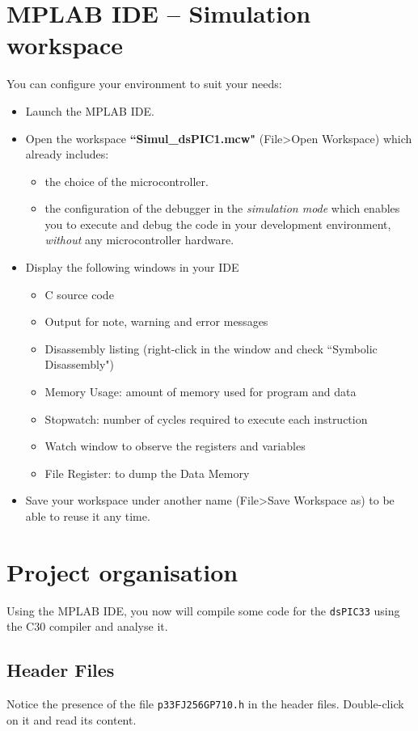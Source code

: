 \documentclass[10pt,a4paper]{article}
\theoremstyle{definition}%
\newcommand{\kw}[1]{\texttt{#1}}
\begin{document}
\section{MPLAB IDE -- Simulation workspace}
You can configure your environment to suit your needs:
\begin{itemize}
\item Launch the MPLAB IDE.
\item Open the workspace \textbf{``Simul\_dsPIC1.mcw"} (File>Open Workspace) which already includes:
\begin{itemize}
	 \item the choice of the microcontroller.
	 \item the configuration of the debugger in the \textit{simulation mode} which enables you to execute and debug the code in your development environment, \textit{without} any microcontroller hardware.
 \end{itemize}

\item Display the following windows in your IDE
\begin{itemize}
	\item C source code
	\item Output for note, warning and error messages
	\item Disassembly listing (right-click in the window and check ``Symbolic Disassembly")
	\item Memory Usage: amount of memory used for program and data
	\item Stopwatch: number of cycles required to execute each instruction
	\item Watch window to observe the registers and variables
	\item File Register: to dump the Data Memory
\end{itemize}
\item Save your workspace under another name (File>Save Workspace as) to be able to reuse it any time.
\end{itemize}




\section{Project organisation}
Using the MPLAB IDE, you now will compile some code for the \kw{dsPIC33} using the C30 compiler and analyse it. %
\subsection{ Header Files}
Notice the presence of the file \kw{p33FJ256GP710.h} in the header files. Double-click on it and read its content.
\end{document}
